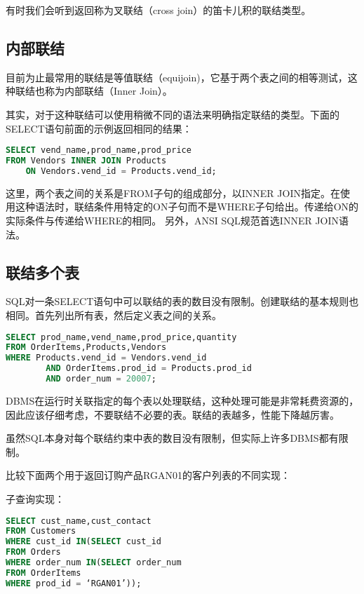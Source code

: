 有时我们会听到返回称为叉联结（cross join）的笛卡儿积的联结类型。
\subsection{内部联结}

目前为止最常用的联结是等值联结（equijoin)，它基于两个表之间的相等测试，这种联结也称为内部联结（Inner Join）。

其实，对于这种联结可以使用稍微不同的语法来明确指定联结的类型。下面的SELECT语句前面的示例返回相同的结果：

\begin{lstlisting}[language=SQL]
SELECT vend_name,prod_name,prod_price
FROM Vendors INNER JOIN Products
	ON Vendors.vend_id = Products.vend_id;
\end{lstlisting}

这里，两个表之间的关系是FROM子句的组成部分，以INNER JOIN指定。在使用这种语法时，联结条件用特定的ON子句而不是WHERE子句给出。传递给ON的实际条件与传递给WHERE的相同。
另外，ANSI SQL规范首选INNER JOIN语法。

\subsection{联结多个表}


SQL对一条SELECT语句中可以联结的表的数目没有限制。创建联结的基本规则也相同。首先列出所有表，然后定义表之间的关系。

\begin{lstlisting}[language=SQL]
SELECT prod_name,vend_name,prod_price,quantity
FROM OrderItems,Products,Vendors
WHERE Products.vend_id = Vendors.vend_id
		AND OrderItems.prod_id = Products.prod_id
		AND order_num = 20007;
\end{lstlisting}


DBMS在运行时关联指定的每个表以处理联结，这种处理可能是非常耗费资源的，因此应该仔细考虑，不要联结不必要的表。联结的表越多，性能下降越厉害。

虽然SQL本身对每个联结约束中表的数目没有限制，但实际上许多DBMS都有限制。

比较下面两个用于返回订购产品RGAN01的客户列表的不同实现：

子查询实现：

\begin{lstlisting}[language=SQL]
SELECT cust_name,cust_contact
FROM Customers
WHERE cust_id IN(SELECT cust_id
FROM Orders
WHERE order_num IN(SELECT order_num
FROM OrderItems
WHERE prod_id = ‘RGAN01’));
\end{lstlisting}

